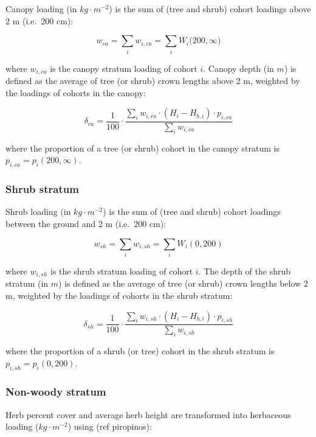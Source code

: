 \documentclass[]{book}
\begin{document}
Canopy loading (in \(kg\cdot m^{-2}\)) is the sum of (tree and shrub)
cohort loadings above 2 m (i.e.~200 cm):

\begin{equation}
w_{ca} = \sum_{i}w_{i,ca} =\sum_{i}{W_i(200, \infty})
\end{equation}

where \(w_{i,ca}\) is the canopy stratum loading of cohort \(i\). Canopy
depth (in \(m\)) is defined as the average of tree (or shrub) crown
lengths above 2 m, weighted by the loadings of cohorts in the canopy:

\begin{equation}
\delta_{ca} = \frac{1}{100}\cdot\frac{\sum_{i}{w_{i,ca}\cdot (H_i - H_{b,i})\cdot p_{i,ca} }}{\sum_{i}{w_{i,ca}}}
\end{equation}

where the proportion of a tree (or shrub) cohort in the canopy stratum
is \(p_{i,ca}=p_{i}(200,\infty)\).

\subsubsection{Shrub stratum}\label{shrub-stratum}

Shrub loading (in \(kg\cdot m^{-2}\)) is the sum of (tree and shrub)
cohort loadings between the ground and 2 m (i.e.~200 cm):

\begin{equation}
w_{sh} = \sum_{i}w_{i,sh} =\sum_{i}W_i(0, 200)
\end{equation}

where \(w_{i,sh}\) is the shrub stratum loading of cohort \(i\). The
depth of the shrub stratum (in \(m\)) is defined as the average of tree
(or shrub) crown lengths below 2 m, weighted by the loadings of cohorts
in the shrub stratum:

\begin{equation}
\delta_{sh} = \frac{1}{100}\cdot \frac{\sum_{i}{w_{i,sh}\cdot (H_i - H_{b,i})\cdot p_{i,sh} }}{\sum_{i}{w_{i,sh}}}
\end{equation}

where the proportion of a shrub (or tree) cohort in the shrub stratum is
\(p_{i,sh}=p_{i}(0,200)\).

\subsubsection{Non-woody stratum}\label{non-woody-stratum}

Herb percent cover and average herb height are transformed into
herbaceous loading (\(kg\cdot m^{-2}\)) using (ref piropinos):
\end{document}
